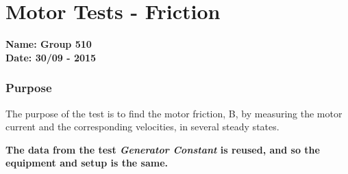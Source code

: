 \pagebreak
\section{Motor Tests - Friction} \label{app:motorTestFriction}
\textbf{Name: Group 510}\\
\textbf{Date: 30/09 - 2015}

\subsubsection{Purpose}
The purpose of the test is to find the motor friction, B, by measuring the motor current and the corresponding velocities, in several steady states.

\textbf{The data from the test \textit{Generator Constant} is reused, and so the equipment and setup is the same.}

